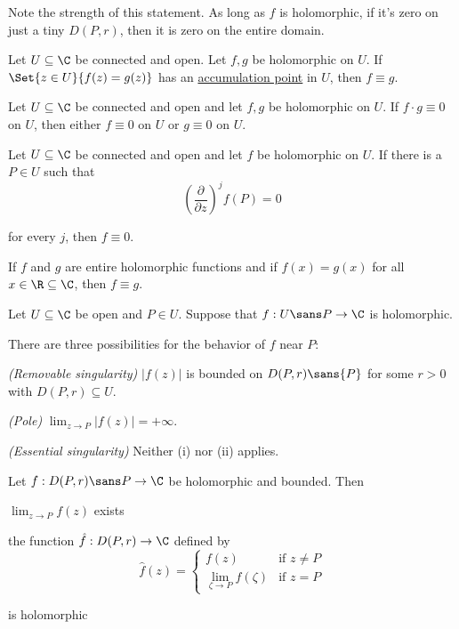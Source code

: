 Note the strength of this statement. As long as $f$ is holomorphic, if it's
zero on just a tiny $D(P,r)$, then it is zero on the entire domain.

\Corollary{}\label{ac6f6ea}

Let $U\subseteq\C$ be connected and open. Let $f,g$ be holomorphic on $U$. If
$\Set{z\in U}{f(z)=g(z)}$ has an \href{b0219cd}{accumulation point} in $U$,
then $f\equiv g$.

\Corollary{}\label{faf57f7}

Let $U\subseteq\C$ be connected and open and let $f,g$ be holomorphic on $U$.
If $f\cdot g\equiv0$ on $U$, then either $f\equiv0$ on $U$ or $g\equiv0$ on
$U$.

\Corollary{}\label{dccfe6b}

Let $U\subseteq\C$ be connected and open and let $f$ be holomorphic on $U$. If
there is a $P\in U$ such that
$$
  \left(\frac\partial{\partial z}\right)^jf(P)=0
$$

for every $j$, then $f\equiv0$.

\Corollary{}\label{bd8ae3b}

If $f$ and $g$ are entire holomorphic functions and if $f(x)=g(x)$ for all
$x\in\R\subseteq\C$, then $f\equiv g$.

\label{a7f062e}

Let $U\subseteq\C$ be open and $P\in U$. Suppose that $f:U\sans P\to\C$ is
holomorphic.

There are three possibilities for the behavior of $f$ near $P$:
\begin{enumerati}
  \item \textit{(Removable singularity)} $|f(z)|$ is bounded on $D(P,r)\sans{P}$
  for some $r>0$ with $D(P,r)\subseteq U$.
  \item \textit{(Pole)} $\lim_{z\to P}|f(z)|=+\infty$.
  \item \textit{(Essential singularity)} Neither (i) nor (ii) applies.
\end{enumerati}

\label{f42a663}

Let $f:D(P,r)\sans P\to\C$ be holomorphic and bounded. Then
\begin{enumerata}
  \item $\lim_{z\to P}f(z)$ exists
  \item the function $\hat f:D(P,r)\to\C$ defined by
  $$
    \hat f(z)=\begin{cases}
      f(z)                                   & \text{if }z\neq P \\
      \displaystyle\lim_{\zeta\to P}f(\zeta) & \text{if }z=P
    \end{cases}
  $$

  is holomorphic
\end{enumerata}

